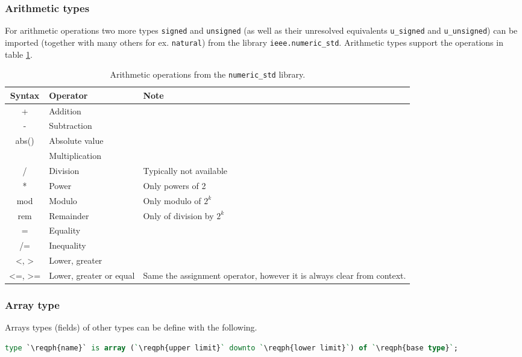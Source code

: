 \subsubsection{Arithmetic types}
For arithmetic operations two more types \texttt{signed} and \texttt{unsigned}
(as well as their unresolved equivalents \texttt{u\_signed} and
\texttt{u\_unsigned}) can be imported (together with many others for ex.
\texttt{natural}) from the library \texttt{ieee.numeric\_std}. Arithmetic types
support the operations in table \ref{tab:arithmetic-type-ops}.
\begin{table}[h]
  \begin{tabularx}{\linewidth}{>{\ttfamily}c p{.3\linewidth} X}
    \toprule
    \textrm{Syntax} & Operator & Note \\
    \midrule
    + & Addition \\
    - & Subtraction \\
    abs() & Absolute value \\
    * & Multiplication \\
    / & Division & Typically not available\\
    ** & Power & Only powers of 2 \\
    mod & Modulo & Only modulo of \(2^k\) \\
    rem & Remainder & Only of division by \(2^k\) \\
    = & Equality \\
    /= & Inequality \\
    <\textrm{,} > & Lower, greater \\
    <=\textrm{,} >= & Lower, greater or equal & Same the assignment operator, however it is always clear from context. \\
    \bottomrule
  \end{tabularx}
  \caption{
    Arithmetic operations from the \texttt{numeric\_std} library.
    \label{tab:arithmetic-type-ops}
  }
\end{table}

\subsubsection{Array type}
Arrays types (fields) of other types can be define with the following.
\begin{lstlisting}[language=vhdl]
type `\reqph{name}` is array (`\reqph{upper limit}` downto `\reqph{lower limit}`) of `\reqph{base type}`;
\end{lstlisting}

